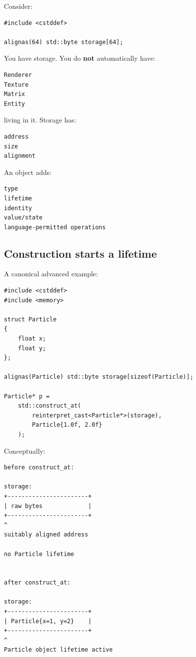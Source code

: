 Consider:

\begin{verbatim}
#include <cstddef>

alignas(64) std::byte storage[64];
\end{verbatim}

You have storage. You do \textbf{not} automatically have:

\begin{verbatim}
Renderer
Texture
Matrix
Entity
\end{verbatim}

living in it. Storage has:

\begin{verbatim}
address
size
alignment
\end{verbatim}

An object adds:

\begin{verbatim}
type
lifetime
identity
value/state
language-permitted operations
\end{verbatim}

\subsection{Construction starts a lifetime}\label{05-engine-i-ch002-construction-starts-a-lifetime}

A canonical advanced example:

\begin{verbatim}
#include <cstddef>
#include <memory>

struct Particle
{
    float x;
    float y;
};

alignas(Particle) std::byte storage[sizeof(Particle)];

Particle* p =
    std::construct_at(
        reinterpret_cast<Particle*>(storage),
        Particle{1.0f, 2.0f}
    );
\end{verbatim}

Conceptually:

\begin{verbatim}
before construct_at:

storage:
+-----------------------+
| raw bytes             |
+-----------------------+
^
suitably aligned address

no Particle lifetime


after construct_at:

storage:
+-----------------------+
| Particle{x=1, y=2}    |
+-----------------------+
^
Particle object lifetime active
\end{verbatim}

